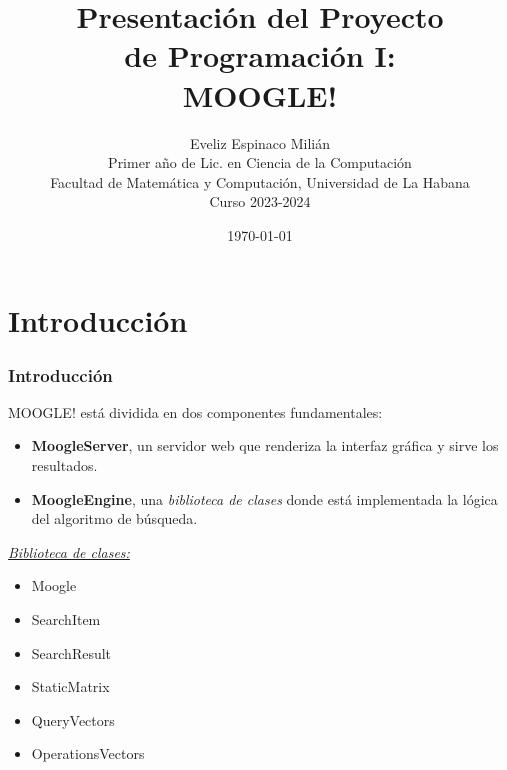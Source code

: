 \documentclass{beamer}
\title{\Huge{Presentación del Proyecto \\ de Programación I: \\ \vspace{0.45cm} \textbf{ MOOGLE!} }}
\date{\today}
\author{Eveliz Espinaco Milián \\ Primer año de Lic. en Ciencia de la Computación \\ Facultad de Matemática y Computación, Universidad de La Habana \\ Curso 2023-2024}
\begin{document}
{%

\begin{frame}
  \vspace{-1cm}
  \titlepage %
\end{frame}
}%

\begin{frame}
\tableofcontents %
\end{frame}

\section{Introducción} %

\begin{frame}
  \frametitle{Introducción} 
  \vspace{-2cm}
  MOOGLE! está dividida en dos componentes fundamentales:
  \begin{itemize}
    \item \textbf{MoogleServer}, un servidor web que renderiza la interfaz gráfica y sirve los resultados.
    \item \textbf{MoogleEngine}, una \textit{biblioteca de clases} donde está implementada la lógica del algoritmo de búsqueda. \\
  \end{itemize}
 
  \textit{\underline{Biblioteca de clases:}}
  \vspace{-0.3cm}
  \begin{multicols*}{2}
   
    \begin{itemize}
      \item  Moogle
      \item SearchItem
      \item SearchResult
    \end{itemize}

    \begin{itemize}
      \item StaticMatrix
      \item QueryVectors
      \item OperationsVectors
    \end{itemize} 

  \end{multicols*}
  


\end{frame}
\end{document}
